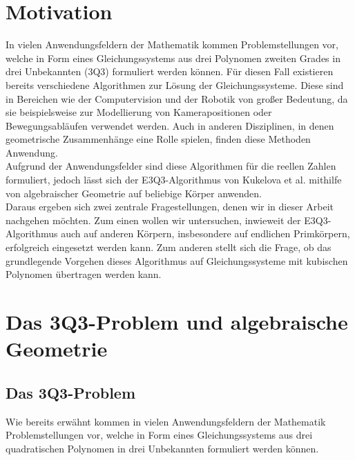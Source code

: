 \documentclass[a4paper,oneside, 11pt, openany%
]{article}
\theoremstyle{custom}
\theoremstyle{custom}
\begin{document}
	\pagestyle{fancy}
	\section{Motivation}\label{chp:Motivation}
	In vielen Anwendungsfeldern der Mathematik kommen Problemstellungen vor, welche in Form eines Gleichungssystems aus drei Polynomen zweiten Grades in drei Unbekannten (3Q3) formuliert werden können. Für diesen Fall existieren bereits verschiedene Algorithmen zur Lösung der Gleichungssysteme. Diese sind in Bereichen wie der Computervision und der Robotik von großer Bedeutung, da sie beispielsweise zur Modellierung von Kamerapositionen oder Bewegungsabläufen verwendet werden. Auch in anderen Disziplinen, in denen geometrische Zusammenhänge eine Rolle spielen, finden diese Methoden Anwendung.\\
	
	Aufgrund der Anwendungsfelder sind diese Algorithmen für die reellen Zahlen formuliert, jedoch lässt sich der E3Q3-Algorithmus von Kukelova et al. \cite{kukelova2016efficient} mithilfe von algebraischer Geometrie auf beliebige Körper anwenden.\\
	
	Daraus ergeben sich zwei zentrale Fragestellungen, denen wir in dieser Arbeit nachgehen möchten. Zum einen wollen wir untersuchen, inwieweit der E3Q3-Algorithmus auch auf anderen Körpern, insbesondere auf endlichen Primkörpern, erfolgreich eingesetzt werden kann. Zum anderen stellt sich die Frage, ob das grundlegende Vorgehen dieses Algorithmus auf Gleichungssysteme mit kubischen Polynomen übertragen werden kann.
	\newpage
	\section{Das 3Q3-Problem und algebraische Geometrie}
	\subsection{Das 3Q3-Problem}
	Wie bereits erwähnt kommen in vielen Anwendungsfeldern der Mathematik Problemstellungen vor, welche in Form eines Gleichungssystems aus drei quadratischen Polynomen in drei Unbekannten formuliert werden können.
	
\end{document}

